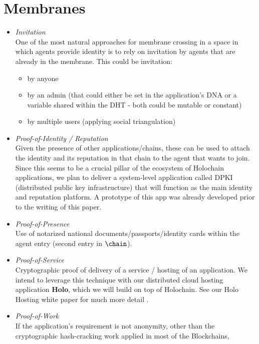 \documentclass[twocolumn,showpacs,%
  nofootinbib,aps,superscriptaddress,%
  eqsecnum,prd,notitlepage,showkeys,10pt]{revtex4-1}
\begin{document}
\section{Membranes}
\label{apdx:membranes}

\begin{itemize}
  \item \textit{Invitation}\\
  One of the most natural approaches for membrane crossing in a space in which
  agents provide identity is to rely on invitation by agents that are already
  in the membrane. This could be invitation:
  \begin{itemize}
    \item by anyone
    \item by an admin (that could either be set in the application's DNA or a
    variable shared within the DHT - both could be mutable or constant)
    \item by multiple users (applying social triangulation)
  \end{itemize}
  \item \textit{Proof-of-Identity / Reputation}\\
  Given the presence of other applications/chains, these can be used to attach the
  identity and its reputation in that chain to the agent that wants to join.
  Since this seems to be a crucial pillar of the ecosystem of Holochain
  applications, we plan to deliver a system-level application called DPKI
  (distributed public key infrastructure) that will function as the main
  identity and reputation platform.
  A prototype of this app was already developed prior to the writing of
  this paper.
  \item \textit{Proof-of-Presence}\\
  Use of notarized national documents/passports/identity cards within the agent
  entry (second entry in $\chain$).
  \item \textit{Proof-of-Service}\\
  Cryptographic proof of delivery of a service / hosting of an application.
  We intend to leverage this technique with our distributed cloud hosting
  application \textbf{Holo}, which we will build on top of Holochain.
  See our Holo Hosting white paper for much more detail \cite{hosting-wp}.
  \item \textit{Proof-of-Work}\\
  If the application's requirement is not anonymity, other than the
  cryptographic hash-cracking work applied in most of the Blockchains,

\end{itemize}
\end{document}
